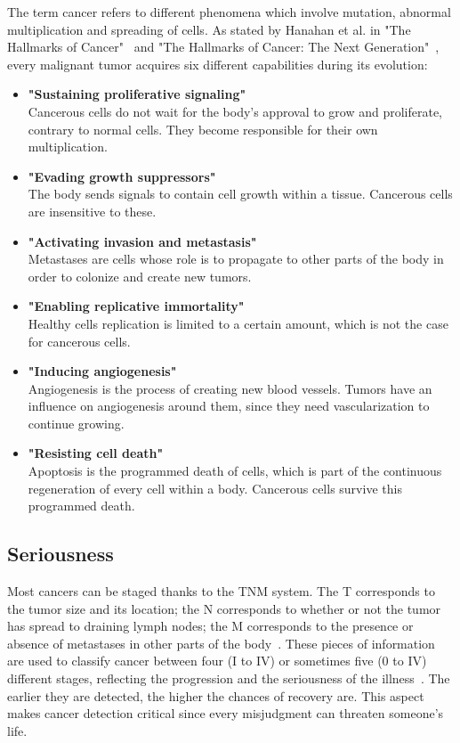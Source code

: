 The term cancer refers to different phenomena which involve mutation, abnormal multiplication and spreading of cells. As stated by Hanahan et al. in "The Hallmarks of Cancer"~\cite{19} and "The Hallmarks of Cancer: The Next Generation"~\cite{20}, every malignant tumor acquires six different capabilities during its evolution: 
\begin{itemize}
	\item \textbf{"Sustaining proliferative signaling"}\\ Cancerous cells do not wait for the body's approval to grow and proliferate, contrary to normal cells. They become responsible for their own multiplication.
	\item \textbf{"Evading growth suppressors"}\\
The body sends signals to contain cell growth within a tissue. Cancerous cells are insensitive to these. 
	\item \textbf{"Activating invasion and metastasis"}\\
Metastases are cells whose role is to propagate to other parts of the body in order to colonize and create new tumors. 
	\item \textbf{"Enabling replicative immortality"}\\
Healthy cells replication is limited to a certain amount, which is not the case for cancerous cells. 
	\item \textbf{"Inducing angiogenesis"}
\\Angiogenesis is the process of creating new blood vessels. Tumors have an influence on angiogenesis around them, since they need vascularization to continue growing. 
	\item \textbf{"Resisting cell death"}
\\Apoptosis is the programmed death of cells, which is part of the continuous regeneration of every cell within a body. Cancerous cells survive this programmed death. 
\end{itemize}


\subsection{Seriousness}
\setlength{\marginparwidth}{3cm}\leavevmode {}Most cancers can be staged thanks to the TNM system. The T corresponds to the tumor size and its location; the N corresponds to whether or not the tumor has spread to draining lymph nodes; the M corresponds to the presence or absence of metastases in other parts of the body~\cite{21}. These pieces of information are used to classify cancer between four (I to IV) or sometimes five (0 to IV) different stages, reflecting the progression and the seriousness of the illness~\cite{22}. The earlier they are detected, the higher the chances of recovery are. This aspect makes cancer detection critical since every misjudgment can threaten someone's life. 


